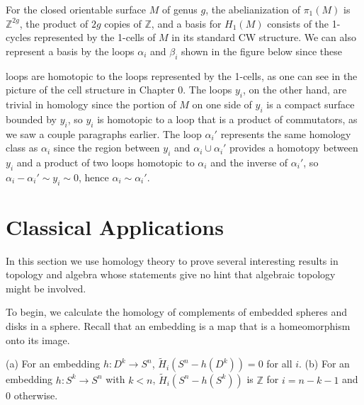\begin{example}
\label{ex:h1-closed-orientable-surface}
For the closed orientable surface $M$ of genus $g$, the abelianization of $\pi_1(M)$ is $\mathbb{Z}^{2g}$, the product of $2g$ copies of $\mathbb{Z}$, and a basis for $H_1(M)$ consists of the 1-cycles represented by the 1-cells of $M$ in its standard CW structure. We can also represent a basis by the loops $\alpha_i$ and $\beta_i$ shown in the figure below since these
\end{example}



loops are homotopic to the loops represented by the 1-cells, as one can see in the picture of the cell structure in Chapter 0. The loops $y_i$, on the other hand, are trivial in homology since the portion of $M$ on one side of $y_i$ is a compact surface bounded by $y_i$, so $y_i$ is homotopic to a loop that is a product of commutators, as we saw a couple paragraphs earlier. The loop $\alpha_i'$ represents the same homology class as $\alpha_i$ since the region between $y_i$ and $\alpha_i \cup \alpha_i'$ provides a homotopy between $y_i$ and a product of two loops homotopic to $\alpha_i$ and the inverse of $\alpha_i'$, so $\alpha_i - \alpha_i' \sim y_i \sim 0$, hence $\alpha_i \sim \alpha_i'$.



\section{Classical Applications}

In this section we use homology theory to prove several interesting results in topology and algebra whose statements give no hint that algebraic topology might be involved.

To begin, we calculate the homology of complements of embedded spheres and disks in a sphere. Recall that an embedding is a map that is a homeomorphism onto its image.

\begin{proposition}
\label{prop:homology-sphere-complement-disk-sphere}
(a) For an embedding $h:D^k \to S^n$, $\tilde{H}_i(S^n - h(D^k)) = 0$ for all $i$.
(b) For an embedding $h:S^k \to S^n$ with $k < n$, $\tilde{H}_i(S^n - h(S^k))$ is $\mathbb{Z}$ for $i = n - k - 1$ and $0$ otherwise.
\end{proposition}


